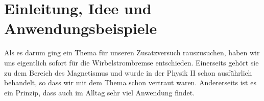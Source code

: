 



\section{Einleitung, Idee und Anwendungsbeispiele}

Als es darum ging ein Thema für unseren Zusatzversuch rauszusuchen, haben wir uns
eigentlich sofort für die Wirbelstrombremse entschieden. Einerseits gehört sie zu
dem Bereich des Magnetismus und wurde in der Physik II schon ausführlich behandelt,
so dass wir mit dem Thema schon vertraut waren. Andererseits ist es ein Prinzip,
dass auch im Alltag sehr viel Anwendung findet.




